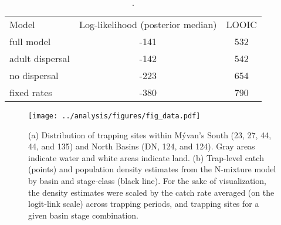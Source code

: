 \documentclass[11pt]{article}
\begin{document}


\clearpage



\clearpage
\begin{table}
\caption{\label{tab:compare}
.
}
\setlength{\tabcolsep}{12pt}
\begin{tabular}{lcc}
\toprule
Model                  &    Log-likelihood (posterior median) & LOOIC \\
\cmidrule{1-3}
full model             & -141 & 532 \\
adult dispersal        & -142 & 542 \\
no dispersal           & -223 & 654 \\
fixed rates            & -380 & 790 \\
\bottomrule
\end{tabular}
\end{table}
\clearpage

\clearpage
\begin{figure}
\centering
\texttt{[image: ../analysis/figures/fig\_data.pdf]}
\caption{\label{fig:data}
(a) Distribution of trapping sites within M\'{y}van's
South (23, 27, 44, 44, and 135) and North Basins (DN, 124, and 124).
Gray areas indicate water and white areas indicate land.
(b) Trap-level catch (points) and
population density estimates from the N-mixture model by basin and stage-class (black line).
For the sake of visualization, the density estimates were scaled
by the catch rate averaged (on the logit-link scale) across trapping periods,
and trapping sites for a given basin \times stage combination.
}
\end{figure}
\clearpage
\end{document}
